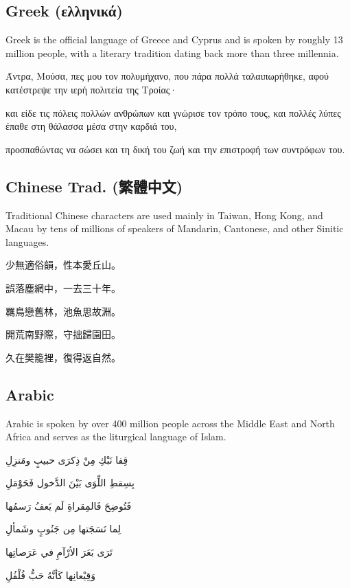 \documentclass{article}
\begin{document}
\subsection{Greek ({\greekfont ελληνικά})}\label{greek}

Greek is the official language of Greece and Cyprus and is spoken by roughly 13 million people, with a literary tradition dating back more than three millennia.

Άντρα, Μούσα, πες μου τον πολυμήχανο, που πάρα πολλά
ταλαιπωρήθηκε, αφού κατέστρεψε την ιερή πολιτεία της Τροίας·

και είδε τις πόλεις πολλών ανθρώπων και γνώρισε τον τρόπο τους,
και πολλές λύπες έπαθε στη θάλασσα μέσα στην καρδιά του,

προσπαθώντας να σώσει και τη δική του ζωή
και την επιστροφή των συντρόφων του.



\subsection{Chinese Trad. ({\chinesefont 繁體中文})}\label{chinese-trad}

Traditional Chinese characters are used mainly in Taiwan, Hong Kong, and Macau by tens of millions of speakers of Mandarin, Cantonese, and other Sinitic languages.

少無適俗韻，性本愛丘山。

誤落塵網中，一去三十年。

羈鳥戀舊林，池魚思故淵。

開荒南野際，守拙歸園田。

久在樊籠裡，復得返自然。

\subsection{Arabic}\label{arabic}

Arabic is spoken by over 400 million people across the Middle East and North Africa and serves as the liturgical language of Islam.

قِفا نَبْكِ مِنْ ذِكرَى حبيبٍ ومَنزِلِ

بِسِقطِ اللِّوَى بَيْنَ الدَّخول فَحَوْمَلِ

فَتُوضِحَ فَالمِقراةِ لَم يَعفُ رَسمُها

لِما نَسَجَتها مِن جَنُوبٍ وشَمألِ

تَرَى بَعَرَ الأرْآمِ في عَرَصاتِها

وَقِيْعانِها كَأنَّهُ حَبُّ فُلْفُلِ
\end{document}
